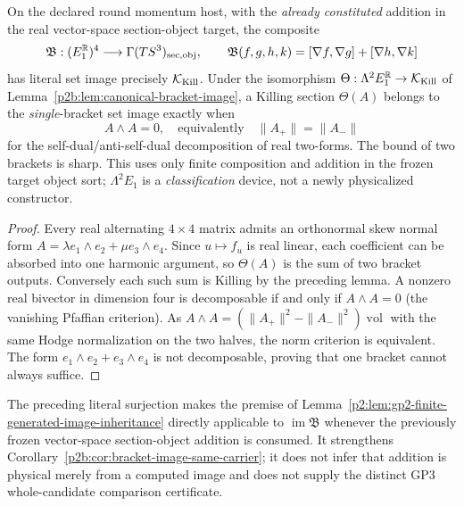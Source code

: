 \documentclass[12pt,a4paper]{article}
\begin{document}
\begin{lemma}
\label{p2b:lem:v264-two-bracket-surjection}
On the declared round momentum host, with the \emph{already constituted}
addition in the real vector-space section-object target, the composite
\[
 \mathfrak B:(E_1^{\mathbb R})^4\longrightarrow
 \Gamma(TS^3)_{\rm sec,obj},\qquad
 \mathfrak B(f,g,h,k)=[\nabla f,\nabla g]+[\nabla h,\nabla k]
\]
has literal set image precisely $\mathcal K_{\rm Kill}$.  Under the
isomorphism $\Theta:\Lambda^2E_1^{\mathbb R}\to\mathcal K_{\rm Kill}$
of Lemma~\ref{p2b:lem:canonical-bracket-image}, a Killing section
$\Theta(A)$ belongs to the \emph{single}-bracket set image exactly when
\[
 A\wedge A=0,
 \quad\text{equivalently}\quad
 \|A_+\|=\|A_-\|
\]
for the self-dual/anti-self-dual decomposition of real two-forms.
The bound of two brackets is sharp.  This uses only finite composition
and addition in the frozen target object sort; $\Lambda^2E_1$ is a
\emph{classification} device, not a newly physicalized constructor.
\end{lemma}
\begin{proof}
Every real alternating $4\times4$ matrix admits an orthonormal skew
normal form $A=\lambda e_1\wedge e_2+\mu e_3\wedge e_4$.
Since $u\mapsto f_u$ is real linear, each coefficient can be absorbed
into one harmonic argument, so $\Theta(A)$ is the sum of two bracket
outputs. Conversely each such sum is Killing by the preceding lemma.
A nonzero real bivector in dimension four is decomposable if and only if
$A\wedge A=0$ (the vanishing Pfaffian criterion). As
$A\wedge A=(\|A_+\|^2-\|A_-\|^2)\operatorname{vol}$ with the same
Hodge normalization on the two halves, the norm criterion is equivalent.
The form $e_1\wedge e_2+e_3\wedge e_4$ is not decomposable, proving
that one bracket cannot always suffice.
\end{proof}
\begin{remark}
\label{p2b:rem:v264-literal-inheritance}
The preceding literal surjection makes the premise of
Lemma~\ref{p2:lem:gp2-finite-generated-image-inheritance} directly
applicable to $\operatorname{im}\mathfrak B$ whenever the previously
frozen vector-space section-object addition is consumed. It strengthens
Corollary~\ref{p2b:cor:bracket-image-same-carrier}; it does not infer
that addition is physical merely from a computed image and does not
supply the distinct GP3 whole-candidate comparison certificate.
\end{remark}
\end{document}
